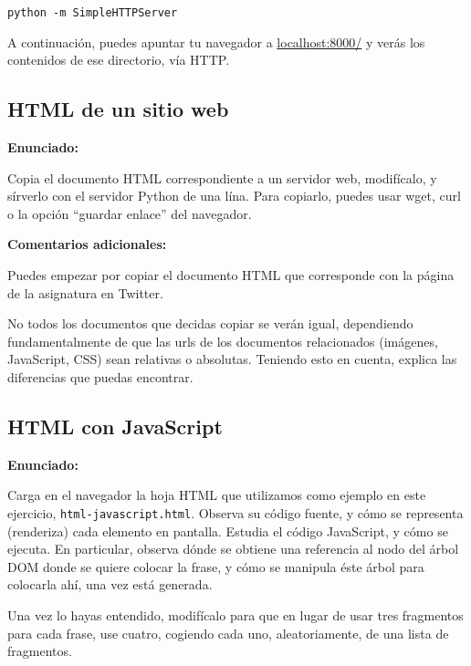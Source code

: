 \begin{verbatim}
python -m SimpleHTTPServer
\end{verbatim}

A continuación, puedes apuntar tu navegador a \url{localhost:8000/} y verás los contenidos de ese directorio, vía HTTP.

\subsection{HTML de un sitio web}
\label{subsec:eje-html-web}

\textbf{Enunciado:}

Copia el documento HTML correspondiente a un servidor web, modifícalo, y sírverlo con el servidor Python de una lína. Para copiarlo, puedes usar wget, curl o la opción ``guardar enlace'' del navegador.

\textbf{Comentarios adicionales:}

Puedes empezar por copiar el documento HTML que corresponde con la página de la asignatura en Twitter.

No todos los documentos que decidas copiar se verán igual, dependiendo fundamentalmente de que las urls de los documentos relacionados (imágenes, JavaScript, CSS) sean relativas o absolutas. Teniendo esto en cuenta, explica las diferencias que puedas encontrar.

\subsection{HTML con JavaScript}
\label{subsec:eje-html-javascript}

\textbf{Enunciado:}

Carga en el navegador la hoja HTML que utilizamos como ejemplo en este ejercicio, \verb|html-javascript.html|. Observa su código fuente, y cómo se representa (renderiza) cada elemento en pantalla. Estudia el código JavaScript, y cómo se ejecuta. En particular, observa dónde se obtiene una referencia al nodo del árbol DOM donde se quiere colocar la frase, y cómo se manipula éste árbol para colocarla ahí, una vez está generada.

Una vez lo hayas entendido, modifícalo para que en lugar de usar tres fragmentos para cada frase, use cuatro, cogiendo cada uno, aleatoriamente, de una lista de fragmentos.

